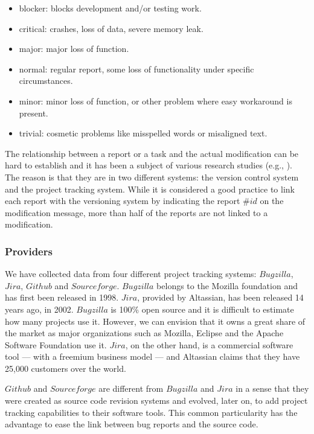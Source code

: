 \begin{itemize}
	\item blocker: blocks development and/or testing work.
	\item critical: crashes, loss of data, severe memory leak.
	\item major: major loss of function.
	\item normal: regular report, some loss of functionality under
 specific circumstances.
  \item minor: minor loss of function, or other problem where easy workaround is present.
	\item trivial: cosmetic problems like misspelled words or misaligned text.
\end{itemize}

The relationship between a report or a task and the actual modification can be hard to establish and it has been a subject of various research studies (e.g., \cite{Antoniol2002,Bachmann2010,Wu2011}).
The reason is that they are in two different systems: the version control system and the project tracking system.
While it is considered a good practice to link each report with the versioning system by indicating the report $\#id$ on the modification message, more than half of the reports are not linked to a modification\cite{Wu2011}.

\subsubsection{Providers\label{sec:bug-provider}}

We have collected data from four different project tracking systems: $Bugzilla$, $Jira$, $Github$ and $Sourceforge$.
 $Bugzilla$ belongs to the Mozilla foundation and has first been released in 1998.
 $Jira$, provided by Altassian, has been released 14 years ago, in 2002.
 $Bugzilla$ is 100\% open source and it is difficult to estimate how many projects use it.
 However, we can envision that it owns a great share of the market as major organizations such as Mozilla, Eclipse and the Apache Software Foundation use it.
 $Jira$, on the other hand, is a commercial software tool --- with a freemium business model --- and Altassian claims that they have 25,000 customers over the world.

$Github$ and $Sourceforge$ are different from $Bugzilla$ and $Jira$ in a sense that they were created as source code revision systems and evolved, later on, to add project tracking capabilities to their software tools.
This common particularity has the advantage to ease the link between bug reports and the source code.

